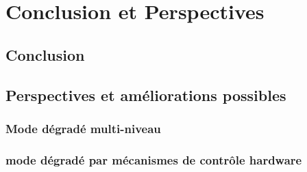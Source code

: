 \documentclass[a4paper,11pt,twoside]{StyleThese}
\begin{document}
\fi


\chapter*{Conclusion et Perspectives}

\section{Conclusion}
\section{Perspectives et améliorations possibles}
    \subsection{Mode dégradé multi-niveau}
    \subsection{mode dégradé par mécanismes de contrôle hardware}

\ifdefined{}
\else


\end{document}
